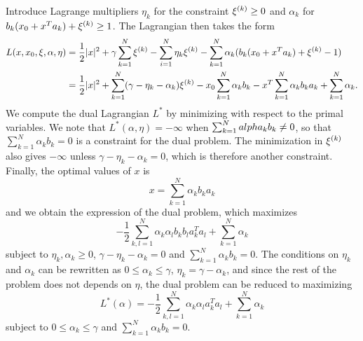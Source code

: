 Introduce Lagrange multipliers $\eta_k$ for the constraint $\xi^{(k)} \geq 0$ and $\alpha_k$ for $b_k(x_0 + x^Ta_k) + \xi^{(k)} \geq 1$. The Lagrangian then takes the form
\begin{align*}
L(x, x_0, \xi, \alpha, \eta) &= \frac12 |x|^2 + \gamma \sum_{k=1}^N \xi^{(k)} 
- \sum_{i=1}^N \eta_k \xi^{(k)} - \sum_{k=1}^N \alpha_k (b_k(x_0 + x^Ta_k) + \xi^{(k)} - 1)\\
&= \frac12 |x|^2 +  \sum_{k=1}^N (\gamma - \eta_k - \alpha_k)\xi^{(k)} - x_0 \sum_{k=1}^N \alpha_k b_k - x^T \sum_{k=1}^N \alpha_k b_k a_k + \sum_{k=1}^N \alpha_k .
\end{align*}
We compute the dual Lagrangian $L^*$ by minimizing with respect to the primal variables. We note that $L^*(\alpha, \eta) = -\infty$ when $\sum_{k=1}^N \\alpha_k b_k \neq 0$, so that $\sum_{k=1}^N \alpha_k b_k = 0$ is a constraint for the dual problem. The minimization in $\xi^{(k)}$ also gives $-\infty$ unless $\gamma - \eta_k - \alpha_k = 0$, which is therefore another constraint. 
Finally, the optimal values of $x$ is 
\[
x = \sum_{k=1}^N \alpha_k b_k a_k
\]
and we obtain the expression of the dual problem, which maximizes
\[
- \frac 12 \sum_{k, l=1}^N \alpha_k \alpha_l b_kb_l a_k^T a_l + \sum_{k=1}^N \alpha_k 
\]
subject to $\eta_k, \alpha_k\geq 0$, $\gamma - \eta_k - \alpha_k = 0$ and $\sum_{k=1}^N \alpha_k b_k = 0$. The conditions on $\eta_k$ and $\alpha_k$ can be rewritten as $0 \leq \alpha_k \leq \gamma$, $\eta_k = \gamma - \alpha_k$, and since the rest of the problem does not depends on $\eta$, the dual problem can be reduced to maximizing
\[
L^*(\alpha) = - \frac 12 \sum_{k, l=1}^N \alpha_k \alpha_l a_k^T a_l 
+ \sum_{k=1}^N \alpha_k
\]
subject to $0 \leq \alpha_k \leq \gamma$ and $\sum_{k=1}^N \alpha_k b_k = 0$.


%

